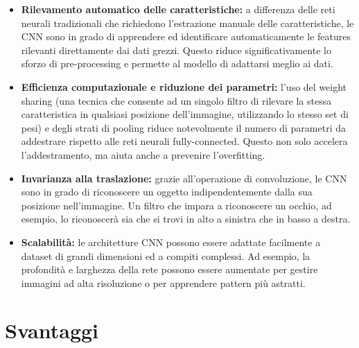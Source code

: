 \documentclass[a4paper,12pt]{report}
\begin{document}
	\begin{itemize}
		\item \textbf{Rilevamento automatico delle caratteristiche:} a differenza delle reti neurali tradizionali che richiedono l'estrazione manuale delle caratteristiche, le CNN sono in grado di apprendere ed identificare automaticamente le features rilevanti direttamente dai dati grezzi. Questo riduce significativamente lo sforzo di pre-processing e permette al modello di adattarsi meglio ai dati.
		\item \textbf{Efficienza computazionale e riduzione dei parametri:} l'uso del weight sharing (una tecnica che consente ad un singolo filtro di rilevare la stessa caratteristica in qualsiasi posizione dell'immagine, utilizzando lo stesso set di pesi) e degli strati di pooling riduce notevolmente il numero di parametri da addestrare rispetto alle reti neurali fully-connected. Questo non solo accelera l'addestramento, ma aiuta anche a prevenire l'overfitting.
		\item \textbf{Invarianza alla traslazione:} grazie all'operazione di convoluzione, le CNN sono in grado di riconoscere un oggetto indipendentemente dalla sua posizione nell'immagine. Un filtro che impara a riconoscere un occhio, ad esempio, lo riconoscerà sia che si trovi in alto a sinistra che in basso a destra.
		\item \textbf{Scalabilità:} le architetture CNN possono essere adattate facilmente a dataset di grandi dimensioni ed a compiti complessi. Ad esempio, la profondità e larghezza della rete possono essere aumentate per gestire immagini ad alta risoluzione o per apprendere pattern più astratti.
	\end{itemize}
	
	\section{Svantaggi}
	
\end{document}
